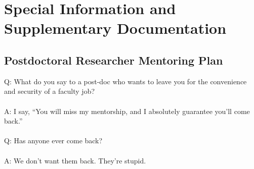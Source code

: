 

\section*{Special Information and Supplementary Documentation}

\subsection*{Postdoctoral Researcher Mentoring Plan}

Q: What do you say to a post-doc who wants to leave you for the convenience and security of a faculty job?
~\\~\\
\noindent A: I say, ``You will miss my mentorship, and I absolutely guarantee you'll come back.''
~\\~\\
\noindent Q: Has anyone ever come back?
~\\~\\
\noindent A: We don't want them back. They're stupid.